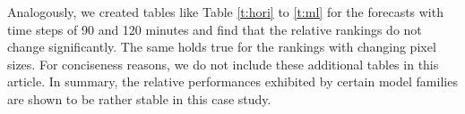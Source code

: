 Analogously, we created tables like Table \ref{t:hori} to \ref{t:ml} for the
    forecasts with time steps of 90 and 120 minutes and find that the relative
    rankings do not change significantly.
The same holds true for the rankings with changing pixel sizes.
For conciseness reasons, we do not include these additional tables in this
    article.
In summary, the relative performances exhibited by certain model families
    are shown to be rather stable in this case study.
